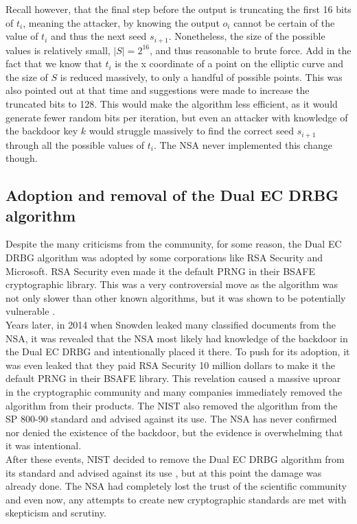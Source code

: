 Recall however, that the final step before the output is truncating the first 16 bits of $t_i$, meaning the attacker, by knowing the output $o_i$ cannot be certain of the value of $t_i$ and thus the next seed $s_{i + 1}$. Nonetheless, the size of the possible values is relatively small, $|S| = 2^{16}$, and thus reasonable to brute force. Add in the fact that we know that $t_i$ is the x coordinate of a point on the elliptic curve and the size of $S$ is reduced massively, to only a handful of possible points. This was also pointed out at that time \cite{backdoor} and suggestions were made to increase the truncated bits to 128. This would make the algorithm less efficient, as it would generate fewer random bits per iteration, but even an attacker with knowledge of the backdoor key $k$ would struggle massively to find the correct seed $s_{i + 1}$ through all the possible values of $t_i$. The NSA never implemented this change though.

\subsection{Adoption and removal of the Dual EC DRBG algorithm}

Despite the many criticisms from the community, for some reason, the Dual EC DRBG algorithm was adopted by some corporations like RSA Security and Microsoft. RSA Security even made it the default PRNG in their BSAFE cryptographic library. This was a very controversial move as the algorithm was not only slower than other known algorithms, but it was shown to be potentially vulnerable \cite{dual-ec-drbg-backdoor}.
\\

Years later, in 2014 when Snowden leaked many classified documents from the NSA, it was revealed that the NSA most likely had knowledge of the backdoor in the Dual EC DRBG and intentionally placed it there. To push for its adoption, it was even leaked that they paid RSA Security 10 million dollars to make it the default PRNG in their BSAFE library. This revelation caused a massive uproar in the cryptographic community and many companies immediately removed the algorithm from their products. The NIST also removed the algorithm from the SP 800-90 standard and advised against its use. The NSA has never confirmed nor denied the existence of the backdoor, but the evidence is overwhelming that it was intentional.
\\

After these events, NIST decided to remove the Dual EC DRBG algorithm from its standard and advised against its use \cite{nist_dualec_analysis}, but at this point the damage was already done. The NSA had completely lost the trust of the scientific community and even now, any attempts to create new cryptographic standards are met with skepticism and scrutiny.